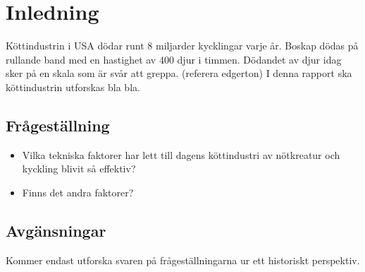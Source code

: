 \section{Inledning}
Köttindustrin i USA dödar runt 8 miljarder kycklingar varje år. Boskap dödas på rullande band med en hastighet av 400 djur i timmen. Dödandet av djur idag sker på en skala som är svår att greppa. (referera edgerton) 
\newline
\newline
I denna rapport ska köttindustrin utforskas bla bla.

\subsection{Frågeställning}
\begin{itemize}
	\item Vilka tekniska faktorer har lett till dagens köttindustri av nötkreatur och kyckling blivit så effektiv?
	\item Finns det andra faktorer?
\end{itemize}

\subsection{Avgänsningar}
Kommer endast utforska svaren på frågeställningarna ur ett historiskt perspektiv. 